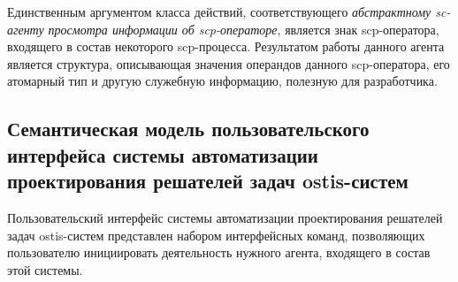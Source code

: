 Единственным аргументом класса действий, соответствующего \textit{абстрактному sc-агенту просмотра информации об scp-операторе}, является знак scp-оператора, входящего в состав некоторого scp-процесса. Результатом работы данного агента является структура, описывающая значения операндов данного scp-оператора, его атомарный тип и другую служебную информацию, полезную для разработчика.

\subsection{Семантическая модель пользовательского интерфейса системы автоматизации проектирования решателей задач ostis-систем}

Пользовательский интерфейс системы автоматизации проектирования решателей задач ostis-систем представлен набором интерфейсных команд, позволяющих пользователю инициировать деятельность нужного агента, входящего в состав этой системы.

